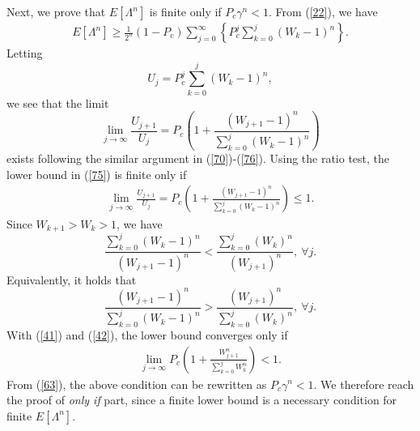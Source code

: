 \documentclass[journal]{IEEEtran}
\begin{document}
Next, we prove that $E\left[\Lambda^n\right]$ is finite only if $ P_c\gamma^n<1$. From (\ref{22}), we have
\begin{equation}
\label{75}
\begin{aligned}
E[\Lambda^n]\geq\frac{1}{2^n}\left(1-P_c\right)\sum_{j=0}^{\infty}\left\{P_c^j \sum_{k=0}^{j}\left(W_k-1\right)^n\right\}.
\end{aligned}
\end{equation}
Letting
\begin{equation}
U_j = P_c^j \sum_{k=0}^{j}\left(W_k-1\right)^n,
\end{equation}
we see that the limit
\begin{equation}
\lim_{j\rightarrow \infty}\frac{U_{j+1}}{U_j} = P_c \left(1+\frac{\left(W_{j+1}-1\right)^n}{\sum_{k=0}^{j}\left(W_k-1\right)^n}\right)
\end{equation}
exists following the similar argument in (\ref{70})-(\ref{76}). Using the ratio test, the lower bound in (\ref{75}) is finite only if
\begin{equation}
\label{41}
\begin{aligned}
\lim_{j\rightarrow \infty} \frac{U_{j+1}}{U_j} = P_c \left(1+\frac{\left(W_{j+1}-1\right)^n}{\sum_{k=0}^{j}\left(W_k-1\right)^n}\right)\leq 1.
\end{aligned}
\end{equation}
Since $W_{k+1}>W_{k}>1$, we have
\begin{equation}
\frac{\sum_{k=0}^{j}\left(W_k-1\right)^n}{\left(W_{j+1}-1\right)^n} < \frac{\sum_{k=0}^{j}\left(W_k\right)^n}{\left(W_{j+1}\right)^n},\ \forall j.
\end{equation}
Equivalently, it holds that
\begin{equation}
\label{42}
\frac{\left(W_{j+1}-1\right)^n}{\sum_{k=0}^{j}\left(W_k-1\right)^n} > \frac{\left(W_{j+1}\right)^n}{\sum_{k=0}^{j}\left(W_k\right)^n},\ \forall j.
\end{equation}
With (\ref{41}) and (\ref{42}), the lower bound converges only if
\begin{equation}
\begin{aligned}
\lim_{j\rightarrow \infty} P_c \left(1+\frac{W_{j+1}^n}{\sum_{k=0}^{j}W_k^n}\right)< 1.
\end{aligned}
\end{equation}
From (\ref{63}), the above condition can be rewritten as $P_c\gamma^n<1$. We therefore reach the proof of \emph{only if} part, since a finite lower bound is a necessary condition for finite $E[\Lambda^n]$.
\end{document}
